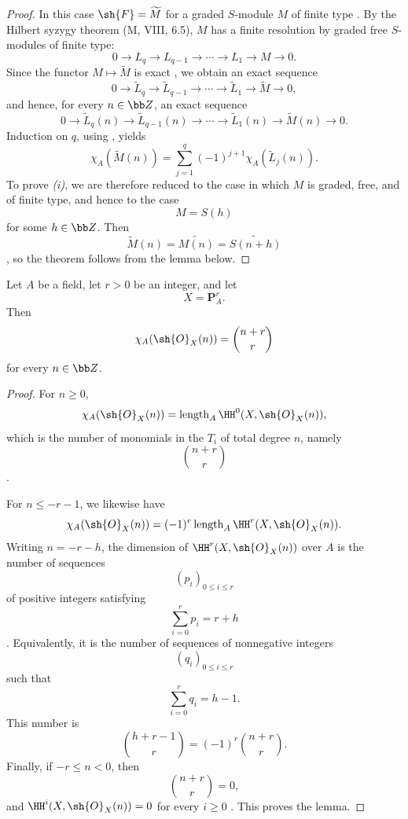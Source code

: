 \begin{proof}
In this case $\sh{F}=\widetilde{M}$ for a graded $S$-module $M$ of finite type .
By the Hilbert syzygy theorem (M, VIII, 6.5), $M$ has a finite resolution by graded free $S$-modules of finite type:
\[
  0\longrightarrow L_q
  \longrightarrow L_{q-1}
  \longrightarrow\cdots
  \longrightarrow L_1
  \longrightarrow M
  \longrightarrow0.
\]
Since the functor $M\mapsto\widetilde{M}$ is exact , we obtain an exact sequence
\[
  0\longrightarrow\widetilde{L}_q
  \longrightarrow\widetilde{L}_{q-1}
  \longrightarrow\cdots
  \longrightarrow\widetilde{L}_1
  \longrightarrow\widetilde{M}
  \longrightarrow0,
\]
and hence, for every $n\in\bb Z$, an exact sequence
\[
  0\longrightarrow\widetilde{L}_q(n)
  \longrightarrow\widetilde{L}_{q-1}(n)
  \longrightarrow\cdots
  \longrightarrow\widetilde{L}_1(n)
  \longrightarrow\widetilde{M}(n)
  \longrightarrow0.
\]
Induction on $q$, using , yields
\[
  \chi_A(\widetilde{M}(n))
  =
  \sum_{j=1}^{q}
  (-1)^{j+1}\chi_A(\widetilde{L}_j(n)).
\]
To prove \emph{(i)}, we are therefore reduced to the case in which $M$ is graded, free, and of finite type, and hence to the case
\[
  M=S(h)
\]
for some $h\in\bb Z$.
Then
\[
  \widetilde{M}(n)
  =
  \widetilde{M(n)}
  =
  \widetilde{S(n+h)}
\]
, so the theorem follows from the lemma below.
\end{proof}

\begin{lemma}[2.5.3.1]
\label{III.2.5.3.1}
Let $A$ be a field, let $r>0$ be an integer, and let
\[
  X=\mathbf{P}_A^r.
\]
Then
\[
  \chi_A(\sh{O}_X(n))
  =
  \binom{n+r}{r}
\]
for every $n\in\bb Z$.
\end{lemma}

\begin{proof}
For $n\geq0$,
\[
  \chi_A(\sh{O}_X(n))
  =
  \operatorname{length}_A\HH^0(X,\sh{O}_X(n)),
\]
which is the number of monomials in the $T_i$ of total degree $n$, namely
\[
  \binom{n+r}{r}
\]
.

For $n\leq-r-1$, we likewise have
\[
  \chi_A(\sh{O}_X(n))
  =
  (-1)^r\operatorname{length}_A\HH^r(X,\sh{O}_X(n)).
\]
Writing $n=-r-h$, the dimension of $\HH^r(X,\sh{O}_X(n))$ over $A$ is the number of sequences
\[
  (p_i)_{0\leq i\leq r}
\]
of positive integers satisfying
\[
  \sum_{i=0}^{r}p_i=r+h
\]
.
Equivalently, it is the number of sequences of nonnegative integers
\[
  (q_i)_{0\leq i\leq r}
\]
such that
\[
  \sum_{i=0}^{r}q_i=h-1.
\]
This number is
\[
  \binom{h+r-1}{r}
  =
  (-1)^r\binom{n+r}{r}.
\]
Finally, if $-r\leq n<0$, then
\[
  \binom{n+r}{r}=0,
\]
and $\HH^i(X,\sh{O}_X(n))=0$ for every $i\geq0$ .
This proves the lemma.
\end{proof}

